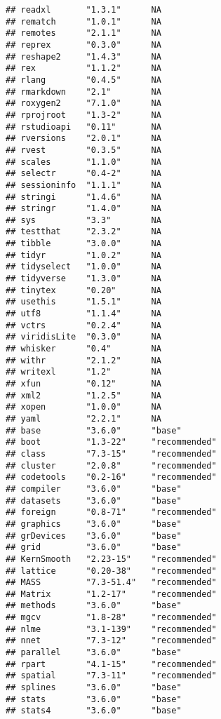 \documentclass[]{book}
\begin{document}
\begin{verbatim}
## readxl       "1.3.1"      NA           
## rematch      "1.0.1"      NA           
## remotes      "2.1.1"      NA           
## reprex       "0.3.0"      NA           
## reshape2     "1.4.3"      NA           
## rex          "1.1.2"      NA           
## rlang        "0.4.5"      NA           
## rmarkdown    "2.1"        NA           
## roxygen2     "7.1.0"      NA           
## rprojroot    "1.3-2"      NA           
## rstudioapi   "0.11"       NA           
## rversions    "2.0.1"      NA           
## rvest        "0.3.5"      NA           
## scales       "1.1.0"      NA           
## selectr      "0.4-2"      NA           
## sessioninfo  "1.1.1"      NA           
## stringi      "1.4.6"      NA           
## stringr      "1.4.0"      NA           
## sys          "3.3"        NA           
## testthat     "2.3.2"      NA           
## tibble       "3.0.0"      NA           
## tidyr        "1.0.2"      NA           
## tidyselect   "1.0.0"      NA           
## tidyverse    "1.3.0"      NA           
## tinytex      "0.20"       NA           
## usethis      "1.5.1"      NA           
## utf8         "1.1.4"      NA           
## vctrs        "0.2.4"      NA           
## viridisLite  "0.3.0"      NA           
## whisker      "0.4"        NA           
## withr        "2.1.2"      NA           
## writexl      "1.2"        NA           
## xfun         "0.12"       NA           
## xml2         "1.2.5"      NA           
## xopen        "1.0.0"      NA           
## yaml         "2.2.1"      NA           
## base         "3.6.0"      "base"       
## boot         "1.3-22"     "recommended"
## class        "7.3-15"     "recommended"
## cluster      "2.0.8"      "recommended"
## codetools    "0.2-16"     "recommended"
## compiler     "3.6.0"      "base"       
## datasets     "3.6.0"      "base"       
## foreign      "0.8-71"     "recommended"
## graphics     "3.6.0"      "base"       
## grDevices    "3.6.0"      "base"       
## grid         "3.6.0"      "base"       
## KernSmooth   "2.23-15"    "recommended"
## lattice      "0.20-38"    "recommended"
## MASS         "7.3-51.4"   "recommended"
## Matrix       "1.2-17"     "recommended"
## methods      "3.6.0"      "base"       
## mgcv         "1.8-28"     "recommended"
## nlme         "3.1-139"    "recommended"
## nnet         "7.3-12"     "recommended"
## parallel     "3.6.0"      "base"       
## rpart        "4.1-15"     "recommended"
## spatial      "7.3-11"     "recommended"
## splines      "3.6.0"      "base"       
## stats        "3.6.0"      "base"       
## stats4       "3.6.0"      "base"       

\end{verbatim}
\end{document}
